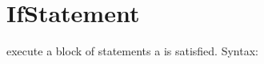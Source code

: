 \documentclass[a4paper,10pt,english]{jupyterBook}
\begin{document}
\sphinxstepscope


\section{If\sphinxhyphen{}Statement}
\label{\detokenize{text/progtut/if:if-statement}}\label{\detokenize{text/progtut/if::doc}}
\sphinxAtStartPar
execute a block of statements  a  is satisfied. Syntax:

\begin{sphinxVerbatim}[commandchars=\\\{\}]
\end{sphinxVerbatim}
\end{document}
